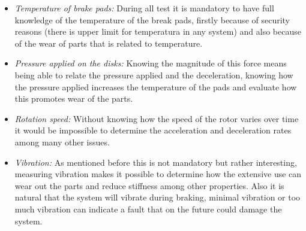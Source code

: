 	\begin{itemize}
		\item\textit{Temperature of brake pads: } During all test it is mandatory to have full knowledge of the temperature of the break pads, firstly because of security reasons (there is upper limit for temperatura in any system) and also because of the wear of parts that is related to temperature.
		\item\textit{Pressure applied on the disks: } Knowing the magnitude of this force means being able to relate the pressure applied and the deceleration, knowing how the pressure applied increases the temperature of the pads and evaluate how this promotes wear of the parts.
		\item\textit{Rotation speed: } Without knowing how the speed of the rotor varies over time it would be impossible to determine the acceleration and deceleration rates among many other issues.
		\item\textit{Vibration: } As mentioned before this is not mandatory but rather interesting, measuring vibration makes it possible to determine how the extensive use can wear out the parts and reduce stiffness among other properties. Also it is natural that the system will vibrate during braking, minimal vibration or too much vibration can indicate a fault that on the future could damage the system.
	\end{itemize}

